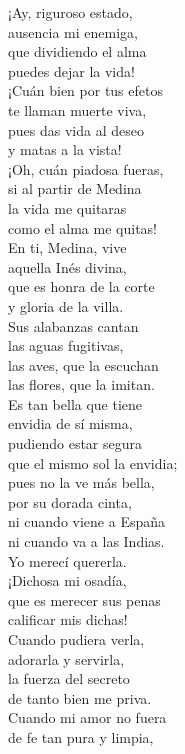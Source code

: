 \begin{exe}
	\ex\label{ex:romancillo}\begin{multicols}{2}¡Ay, riguroso estado,\\ausencia mi enemiga,\\
	que dividiendo el alma\\
	puedes dejar la vida!\\
	¡Cuán bien por tus efetos\\
	te llaman muerte viva,\\
	pues das vida al deseo\\
	y matas a la vista!\\
	¡Oh, cuán piadosa fueras,\\
	si al partir de Medina\\
	la vida me quitaras\\
	como el alma me quitas!\\
	En ti, Medina, vive\\
	aquella Inés divina,\\
	que es honra de la corte\\
	y gloria de la villa.\\
	Sus alabanzas cantan\\
	las aguas fugitivas,\\
	las aves, que la escuchan\\
	las flores, que la imitan.\\
	Es tan bella que tiene\\
	envidia de sí misma,\\
	pudiendo estar segura\\
	que el mismo sol la envidia;\\
	pues no la ve más bella,\\
	por su dorada cinta,\\
	ni cuando viene a España\\
	ni cuando va a las Indias.\\
	Yo merecí quererla.\\
	¡Dichosa mi osadía,\\
	que es merecer sus penas\\
	calificar mis dichas!\\
	Cuando pudiera verla,\\
	adorarla y servirla,\\
	la fuerza del secreto\\
	de tanto bien me priva.\\
	Cuando mi amor no fuera\\
	de fe tan pura y limpia,\\

\end{multicols}
\end{exe}
